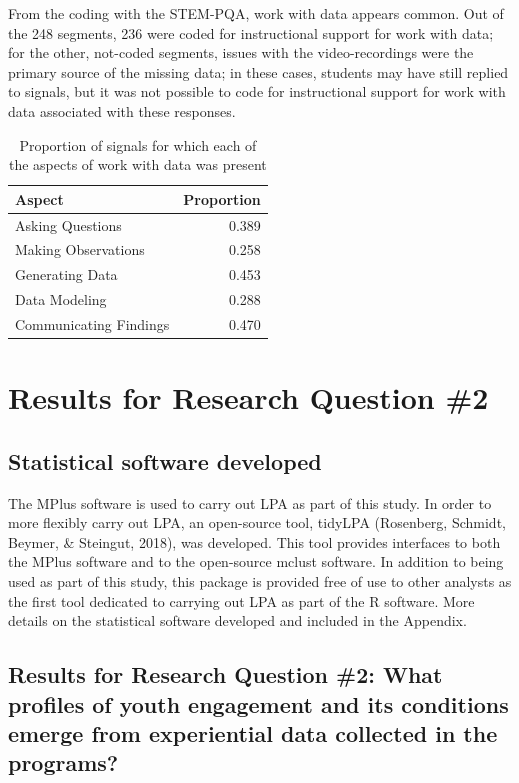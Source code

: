 \documentclass[]{msu-thesis}
\theoremstyle{definition}
\theoremstyle{definition}
\theoremstyle{definition}
\theoremstyle{remark}
\begin{document}
From the coding with the STEM-PQA, work with data appears common. Out of
the 248 segments, 236 were coded for instructional support for work with
data; for the other, not-coded segments, issues with the
video-recordings were the primary source of the missing data; in these
cases, students may have still replied to signals, but it was not
possible to code for instructional support for work with data associated
with these responses.

\begin{table}

\caption{\label{tab:unnamed-chunk-12}Proportion of signals for which each of the aspects of work with data was present}
\centering
\begin{tabular}[t]{lr}
\toprule
Aspect & Proportion\\
\midrule
Asking Questions & 0.389\\
Making Observations & 0.258\\
Generating Data & 0.453\\
Data Modeling & 0.288\\
Communicating Findings & 0.470\\
\bottomrule
\end{tabular}
\end{table}

\chapter{Results for Research Question
\#2}\label{results-for-research-question-2}

\section{Statistical software
developed}\label{statistical-software-developed-1}

The MPlus software is used to carry out LPA as part of this study. In
order to more flexibly carry out LPA, an open-source tool, tidyLPA
(Rosenberg, Schmidt, Beymer, \& Steingut, 2018), was developed. This
tool provides interfaces to both the MPlus software and to the
open-source mclust software. In addition to being used as part of this
study, this package is provided free of use to other analysts as the
first tool dedicated to carrying out LPA as part of the R software. More
details on the statistical software developed and included in the
Appendix.

\section{Results for Research Question \#2: What profiles of youth
engagement and its conditions emerge from experiential data collected in
the
programs?}\label{results-for-research-question-2-what-profiles-of-youth-engagement-and-its-conditions-emerge-from-experiential-data-collected-in-the-programs}
\end{document}
